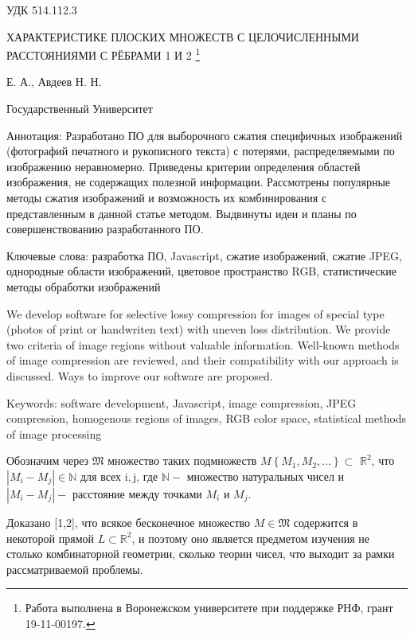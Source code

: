 \documentclass[a4paper,openbib]{article}
\begin{document}
\noindent УДК 514.112.3


\begin{center}
	 ХАРАКТЕРИСТИКЕ ПЛОСКИХ МНОЖЕСТВ С ЦЕЛОЧИСЛЕННЫМИ РАССТОЯНИЯМИ С РЁБРАМИ 1 И 2
	\footnote{
		Работа выполнена в Воронежском университете при поддержке РНФ, грант 19-11-00197.
	}

	 Е. А., Авдеев Н. Н.

	 Государственный Университет
\end{center}

Аннотация: Разработано ПО для выборочного сжатия специфичных изображений (фотографий печатного и рукописного текста) с потерями, распределяемыми по изображению неравномерно.
Приведены критерии определения областей изображения, не содержащих полезной информации. Рассмотрены популярные методы сжатия изображений и возможность их комбинирования с
представленным в данной статье методом. Выдвинуты идеи и планы по совершенствованию разработанного ПО.

Ключевые слова: разработка ПО, Javascript, сжатие изображений, сжатие JPEG, однородные области изображений, цветовое пространство RGB, статистические методы обработки изображений

We develop software for selective lossy compression for images of special type (photos of print or handwriten text) with uneven loss distribution. We provide two criteria of
image regions without valuable information. Well-known methods of image compression are reviewed, and their compatibility with our approach is discussed. Ways to improve our
software are proposed.

Keywords: software development, Javascript, image compression, JPEG compression, homogenous regions of images, RGB color space, statistical methods of image processing




Обозначим через $\mathfrak{M}$ множество таких подмножеств $M\left\{M_{1}, M_{2}, \ldots\right\} \subset$ $\mathbb{R}^{2}$, что $\left|M_{i}-M_{j}\right| \in \mathbb{N}$ для всех $\mathrm{i}, \mathrm{j}$, где $\mathbb{N}-$ множество натуральных чисел и $\left|M_{i}-M_{j}\right|-$ расстояние между точками $M_{i}$ и $M_{j} .$




Доказано [1,2], что всякое бесконечное множество $M \in \mathfrak{M}$ содержится в некоторой прямой $L \subset \mathbb{R}^{2}$, и поэтому оно является предметом изучения не столько комбинаторной геометрии, сколько теории чисел, что выходит за рамки рассматриваемой проблемы.
\end{document}
